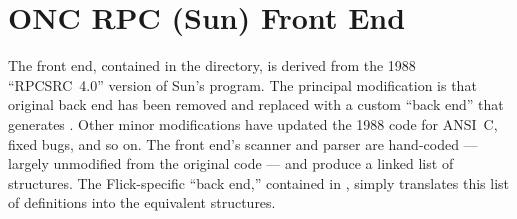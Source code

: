 

\section{ONC RPC (Sun) Front End}
\label{sec:FE:ONC RPC (Sun) Front End}

The \ONCRPC{} front end, contained in the  directory, is
derived from the 1988 ``RPCSRC~4.0'' version of Sun's \rpcgen{} program.  The
principal modification is that original \rpcgen{} back end has been removed and
replaced with a custom ``back end'' that generates \AOI{}\@.  Other minor
modifications have updated the 1988 code for ANSI~C, fixed bugs, and so on.
%
The \ONCRPC{} front end's scanner and parser are hand-coded --- largely
unmodified from the original \rpcgen{} code --- and produce a linked list of
 structures.  The Flick-specific ``back end,'' contained in
, simply translates this list of definitions into the
equivalent \AOI{} structures.

